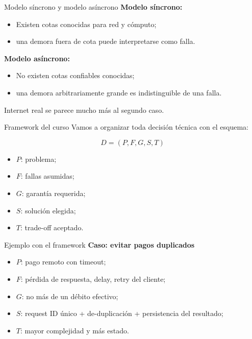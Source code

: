 \documentclass[institutional,screen,none]{ua-engineering-v6-beamer}
\begin{document}
\begin{frame}{Modelo síncrono y modelo asíncrono}
\textbf{Modelo síncrono:}
\begin{itemize}
\item Existen cotas conocidas para red y cómputo;
\item una demora fuera de cota puede interpretarse como falla.
\end{itemize}

\pause

\textbf{Modelo asíncrono:}
\begin{itemize}
\item No existen cotas confiables conocidas;
\item una demora arbitrariamente grande es indistinguible de una falla.
\end{itemize}

\pause

Internet real se parece mucho más al segundo caso.
\end{frame}


\begin{frame}{Framework del curso}
Vamos a organizar toda decisión técnica con el esquema:

\[
D = (P, F, G, S, T)
\]

\begin{itemize}
    \item $P$: problema;
    \item $F$: fallas asumidas;
    \item $G$: garantía requerida;
    \item $S$: solución elegida;
    \item $T$: trade-off aceptado.
\end{itemize}
\end{frame}

\begin{frame}{Ejemplo con el framework}
\textbf{Caso: evitar pagos duplicados}

\begin{itemize}
\item $P$: pago remoto con timeout;
\item $F$: pérdida de respuesta, delay, retry del cliente;
\item $G$: no más de un débito efectivo;
\item $S$: request ID único + de-duplicación + persistencia del resultado;
\item $T$: mayor complejidad y más estado.
\end{itemize}
\end{frame}
\end{document}
